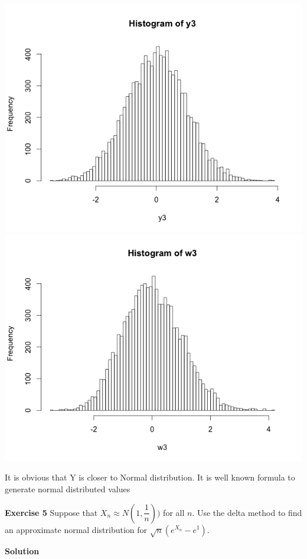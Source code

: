 \documentclass[12pt]{article}
\begin{document}
\begin{list}{()~}{}
\includegraphics[width=1\textwidth]{Rplot03.png}
\includegraphics[width=1\textwidth]{Rplot07.png}

It is obvious that Y is closer to Normal distribution. It is well known formula to generate normal distributed values

\end{list}

\bigskip

\textbf{Exercise 5}
Suppose that $X_n \approx N\left(1, \dfrac{1}{n}\right))$ for all $n$. Use the delta method to find
an approximate normal distribution for $\sqrt{n}(e^{X_n} - e^{1})$.
\medskip

\textbf{Solution}
\end{document}
